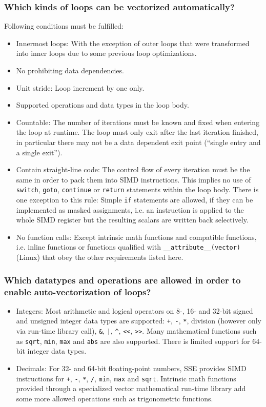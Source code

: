 \documentclass[11pt]{article}
\begin{document}
\subsubsection*{Which kinds of loops can be vectorized automatically?}
Following conditions must be fulfilled:
\begin{itemize}
\item Innermost loops: With the exception of outer loops that were transformed into inner loops due to some previous loop optimizations.
\item No prohibiting data dependencies.
\item Unit stride: Loop increment by one only.
\item Supported operations and data types in the loop body.
\item Countable: The number of iterations must be known and fixed when entering the loop at runtime. The loop must only exit after the last iteration finished, in particular there may not be a data dependent exit point (\enquote{single entry and a single exit}).
\item Contain straight-line code: The control flow of every iteration must be the same in order to pack them into SIMD instructions. This implies no use of \texttt{switch}, \texttt{goto}, \texttt{continue} or \texttt{return} statements within the loop body. There is one exception to this rule: Simple \texttt{if} statements are allowed, if they can be implemented as masked assignments, i.e. an instruction is applied to the whole SIMD register but the resulting scalars are written back selectively.
\item No function calls: Except intrinsic math functions and compatible functions, i.e. inline functions or functions qualified with \texttt{\_\_attribute\_\_(vector)} (Linux) that obey the other requirements listed here.
\end{itemize}

\subsubsection*{Which datatypes and operations are allowed in order to enable auto-vectorization of loops?}
\begin{itemize}
\item Integers: Most arithmetic and logical operators on 8-, 16- and 32-bit signed and unsigned integer data types are supported: \texttt{+}, \texttt{-}, \texttt{*}, division (however only via run-time library call), \texttt{\&}, \texttt{|}, \texttt{\^}, \texttt{<<}, \texttt{>>}. Many mathematical functions such as \texttt{sqrt}, \texttt{min}, \texttt{max} and \texttt{abs} are also supported. There is limited support for 64-bit integer data types.
\item Decimals: For 32- and 64-bit floating-point numbers, SSE provides SIMD instructions for \texttt{+}, \texttt{-}, \texttt{*}, \texttt{/}, \texttt{min}, \texttt{max} and \texttt{sqrt}. Intrinsic math functions provided through a specialized vector mathematical run-time library add some more allowed operations such as trigonometric functions.
\end{itemize}
\end{document}
